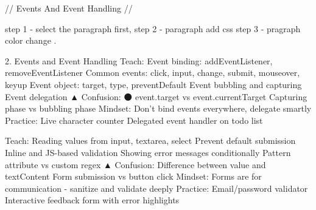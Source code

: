 //  Events And Event Handling //

 step 1 - select the paragraph first,
 step 2 - paragraph add css
 step 3 -   pragraph color change .

 
 2. Events and Event Handling
Teach:
Event binding: addEventListener, removeEventListener
Common events: click, input, change, submit, mouseover, keyup
Event object: target, type, preventDefault
Event bubbling and capturing
Event delegation
▲ Confusion:
⚫ event.target vs event.currentTarget
Capturing phase vs bubbling phase
Mindset:
Don't bind events everywhere, delegate smartly
Practice:
Live character counter
Delegated event handler on todo list 


Teach:
Reading values from input, textarea, select
Prevent default submission
Inline and JS-based validation
Showing error messages conditionally
Pattern attribute vs custom regex
▲ Confusion:
Difference between value and textContent
Form submission vs button click
Mindset:
Forms are for communication - sanitize and validate deeply
Practice:
Email/password validator
Interactive feedback form with error highlights